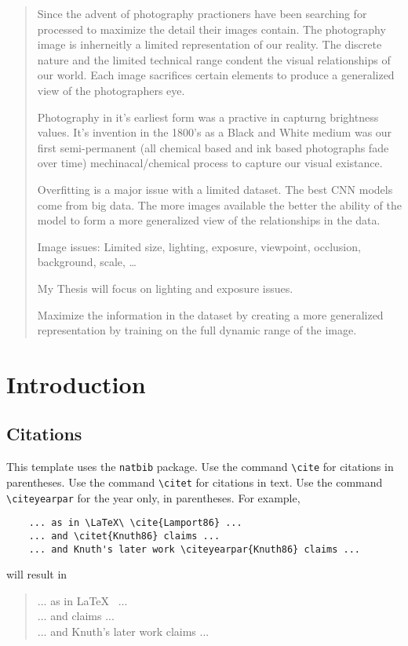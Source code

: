 \documentclass[12pt,leqno]{report}
\begin{document}
\begin{abstract}

  Since the advent of photography practioners have been searching for processed to maximize the detail their images contain.  The photography image is inherneitly a limited representation of our reality.  The discrete nature and the limited technical range condent the visual relationships of our world. Each image sacrifices certain elements to produce a generalized view of the photographers eye. 

Photography in it's earliest form was a practive in capturng brightness values.  It's invention in the 1800's as a Black and White medium was our first semi-permanent (all chemical based and ink based photographs fade over time) mechinacal/chemical process to capture our visual existance. 

Overfitting is a major issue with a limited dataset.  The best CNN models come from big data.  The more images available the better the ability of the model to form a more generalized view of the relationships in the data.  

Image issues: Limited size, lighting, exposure, viewpoint, occlusion, background, scale, \dots

My Thesis will focus on lighting and exposure issues.

Maximize the information in the dataset by creating a more generalized representation by training on the full dynamic range of the image.  
  
\end{abstract}




\chapter{Introduction}


\section{Citations}

This template uses the \verb|natbib|
package.
Use the command \verb|\cite| for citations in parentheses.
Use the command \verb|\citet| for citations in text.
Use the command \verb|\citeyearpar| for the year only, in parentheses.
For example,
\begin{verbatim}
    ... as in \LaTeX\ \cite{Lamport86} ...
    ... and \citet{Knuth86} claims ...
    ... and Knuth's later work \citeyearpar{Knuth86} claims ...
\end{verbatim}
will result in
\begin{quote}
... as in \LaTeX\ \cite{Lamport86} ...\\
... and \citet{Knuth86} claims ...\\
... and Knuth's later work \citeyearpar{Knuth86} claims ...
\end{quote}
\end{document}
